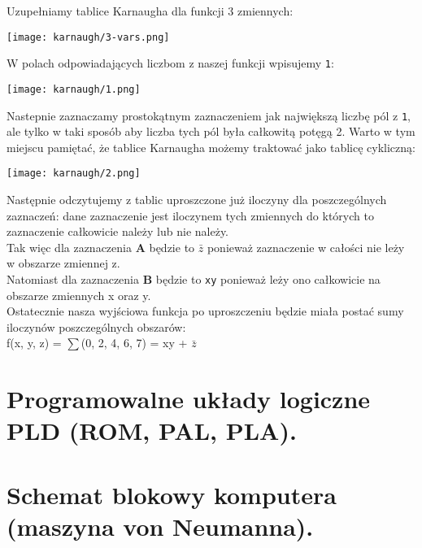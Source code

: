 \documentclass[main.tex]{subfiles}
\begin{document}
    \noindent Uzupełniamy tablice Karnaugha dla funkcji 3 zmiennych: \\

    \begin{center}
        \texttt{[image: karnaugh/3-vars.png]}
    \end{center}

    \noindent W polach odpowiadających liczbom z naszej funkcji wpisujemy \texttt{1}: \\

    \begin{center}
        \texttt{[image: karnaugh/1.png]}
    \end{center}

    \noindent Nastepnie zaznaczamy prostokątnym zaznaczeniem jak największą liczbę pól z \texttt{1}, ale tylko w taki sposób aby liczba tych pól była całkowitą potęgą 2.
    Warto w tym miejscu pamiętać, że tablice Karnaugha możemy traktować jako tablicę cykliczną: \\

    \begin{center}
        \texttt{[image: karnaugh/2.png]}
    \end{center}

    \noindent Następnie odczytujemy z tablic uproszczone już iloczyny dla poszczególnych zaznaczeń: dane zaznaczenie jest iloczynem tych zmiennych do których to zaznaczenie całkowicie należy lub nie należy. \\
    \noindent Tak więc dla zaznaczenia \textbf{\color[HTML]{ff0000}A} będzie to $\bar{z}$ ponieważ zaznaczenie w całości nie leży w obszarze zmiennej z. \\
    \noindent Natomiast dla zaznaczenia \textbf{\color[HTML]{00ff00}B} będzie to \texttt{xy} ponieważ leży ono całkowicie na obszarze zmiennych x oraz y. \\

    \noindent Ostatecznie nasza wyjściowa funkcja po uproszczeniu będzie miała postać sumy iloczynów poszczególnych obszarów: \\
    \noindent f(x, y, z) = $\sum$(0, 2, 4, 6, 7) = xy + $\bar{z}$

    \newpage

    \section{Programowalne układy logiczne PLD (ROM, PAL, PLA).}
    \section{Schemat blokowy komputera (maszyna von Neumanna).}
\end{document}
